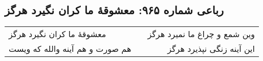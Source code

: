 \begin{center}
\section*{رباعی شماره ۹۶۵: معشوقهٔ ما کران نگیرد هرگز}
\label{sec:0965}
\begin{longtable}{l p{0.5cm} r}
معشوقهٔ ما کران نگیرد هرگز
&&
وین شمع و چراغ ما نمیرد هرگز
\\
هم صورت و هم آینه والله که ویست
&&
این آینه زنگی نپذیرد هرگز
\\
\end{longtable}
\end{center}
